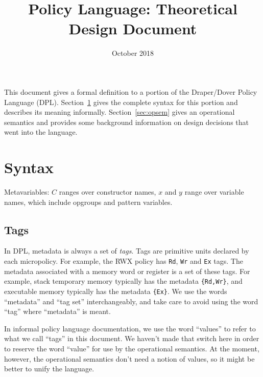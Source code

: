 \documentclass[12pt]{article}
\title{Policy Language: Theoretical Design Document}
\date{October 2018}
\newif\ifdraft
\newcommand{\cjc}[1]{\ifdraft{\color{Blue}[\textbf{CJC}: #1]}\fi}
\begin{document}
\maketitle

This document gives a formal definition to a portion of the Draper/Dover Policy
Language (DPL).  Section~\ref{sec:syntax} gives the complete syntax for this portion
and describes its meaning informally.  Section~\ref{sec:opsem} gives an
operational semantics and provides some background information on design
decisions that went into the language.

\section{Syntax}
\label{sec:syntax}

Metavariables: $C$ ranges over constructor names, $x$ and $y$ range over variable
names, which include opgroups and pattern variables.

\subsection{Tags}

In DPL, metadata is always a set of {\em tags}.  Tags are
primitive units declared by each micropolicy.  For example, the RWX policy has
{\tt Rd}, {\tt Wr} and {\tt Ex} tags.  The metadata associated with a memory
word or register is a set of these tags.  For example, stack temporary memory
typically has the metadata {\tt \{Rd,Wr\}}, and executable memory typically has
the metadata {\tt \{Ex\}}.  We use the words ``metadata'' and ``tag set''
interchangeably, and take care to avoid using the word ``tag'' where
``metadata'' is meant.

In informal policy language documentation, we use the word ``values'' to refer
to what we call ``tags'' in this document.  We haven't made that switch here in
order to reserve the word ``value'' for use by the operational semantics.  At
the moment, however, the operational semantics don't need a notion of values, so
it might be better to unify the language.

\cjc{Most tags have no arguments (they are just a constructor $[[C]]$).  Tags
  with arguments are not quite right in the current version of this document.
  In particular, union and intersection are tricky for tags with arguments, but
  aren't commonly used.}

\bigskip

\ottgrammartabular{
\otttdecl\ottinterrule
\otttag\ottinterrule
\otttf\ottafterlastrule
}
\end{document}
